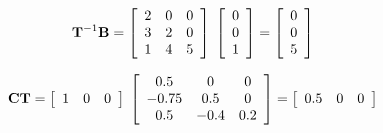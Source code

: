 \[
{\bf{T}}^{ - 1} {\bf{B}} = \left[ {\begin{array}{*{20}c}
   2 & 0 & 0  \\
   3 & 2 & 0  \\
   1 & 4 & 5  \\
\end{array}} \right]\;\left[ {\begin{array}{*{20}c}
   0  \\
   0  \\
   1  \\
\end{array}} \right] = \left[ {\begin{array}{*{20}c}
   0  \\
   0  \\
   5  \\
\end{array}} \right]
\]

\[
{\bf{CT}} = \left[ {\begin{array}{*{20}c}
   1 & 0 & 0  \\
\end{array}} \right]\;\left[ {\begin{array}{*{20}c}
   {0.5} & 0 & 0  \\
   { - 0.75} & {0.5} & 0  \\
   {0.5} & { - 0.4} & {0.2}  \\
\end{array}} \right] = \left[ {\begin{array}{*{20}c}
   {0.5} & 0 & 0  \\
\end{array}} \right]
\]

